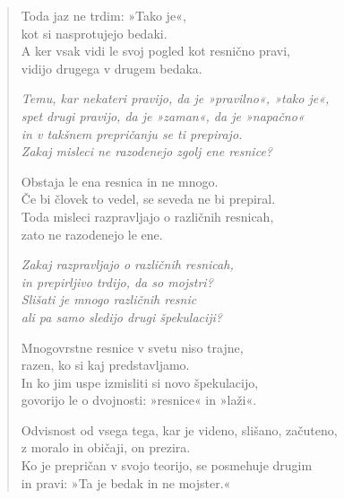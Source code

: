 \clearpage
\begin{verse}

Toda jaz ne trdim: »Tako je«,\\
kot si nasprotujejo bedaki.\\
A ker vsak vidi le svoj pogled kot resnično pravi,\\
vidijo drugega v drugem bedaka.

\emph{Temu, kar nekateri pravijo, da je »pravilno«, »tako je«,\\
spet drugi pravijo, da je »zaman«, da je »napačno«\\
in v takšnem prepričanju se ti prepirajo.\\
Zakaj misleci ne razodenejo zgolj ene resnice?}

Obstaja le ena resnica in ne mnogo.\\
Če bi človek to vedel, se seveda ne bi prepiral.\\
Toda misleci razpravljajo o različnih resnicah,\\
zato ne razodenejo le ene.

\emph{Zakaj razpravljajo o različnih resnicah,\\
in prepirljivo trdijo, da so mojstri?\\
Slišati je mnogo različnih resnic\\
ali pa samo sledijo drugi špekulaciji?}

Mnogovrstne resnice v svetu niso trajne,\\
razen, ko si kaj predstavljamo.\\
In ko jim uspe izmisliti si novo špekulacijo,\\
govorijo le o dvojnosti: »resnice« in »laži«.

Odvisnost od vsega tega, kar je videno, slišano, začuteno,\\
z moralo in običaji, on prezira.\\
Ko je prepričan v svojo teorijo, se posmehuje drugim\\
in pravi: »Ta je bedak in ne mojster.«

\end{verse}


